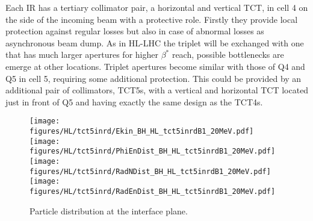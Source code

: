 Each IR has a tertiary collimator pair, a horizontal and vertical TCT, in cell 4 on the side of the incoming beam with a protective role. Firstly they provide local protection against regular losses but also in case of abnormal losses as asynchronous beam dump. As in HL-LHC the triplet will be exchanged with one that has much larger apertures for higher $\beta^*$ reach, possible bottlenecks are emerge at other locations. Triplet apertures become similar with those of Q4 and Q5 in cell 5, requiring some additional protection. This could be provided by an additional pair of collimators, TCT5s, with a vertical and horizontal TCT located just in front of Q5 and having exactly the same design as the TCT4s.




% 

\begin{figure}
\begin{center}
\texttt{[image: figures/HL/tct5inrd/Ekin\_BH\_HL\_tct5inrdB1\_20MeV.pdf]}
\texttt{[image: figures/HL/tct5inrd/PhiEnDist\_BH\_HL\_tct5inrdB1\_20MeV.pdf]}
\texttt{[image: figures/HL/tct5inrd/RadNDist\_BH\_HL\_tct5inrdB1\_20MeV.pdf]}
\texttt{[image: figures/HL/tct5inrd/RadEnDist\_BH\_HL\_tct5inrdB1\_20MeV.pdf]}
\end{center}
\vspace{-0.6cm}
 \caption{Particle distribution at the interface plane.}
  \label{tct5inrdb1retr}
\end{figure}


